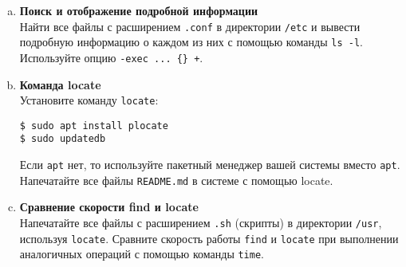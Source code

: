 \documentclass{article}
\begin{document}
\begin{enumerate}[a.]
\item \textbf{Поиск и отображение подробной информации}\\
Найти все файлы с расширением \texttt{.conf} в директории \texttt{/etc} и вывести подробную информацию о каждом из них с помощью команды \texttt{ls -l}. Используйте опцию \texttt{-exec ... \{\} +}.


\item \textbf{Команда locate}\\
Установите команду \texttt{locate}:
\begin{lstlisting}
$ sudo apt install plocate
$ sudo updatedb
\end{lstlisting}
Если \texttt{apt} нет, то используйте пакетный менеджер вашей системы вместо \texttt{apt}.\\
Напечатайте все файлы \texttt{README.md} в системе с помощью locate.


\item \textbf{Сравнение скорости find и locate}\\
Напечатайте все файлы с расширением \texttt{.sh} (скрипты) в директории \texttt{/usr}, используя \texttt{locate}. Сравните скорость работы \texttt{find} и \texttt{locate} при выполнении аналогичных операций с помощью команды \texttt{time}.


\end{enumerate}
\end{document}
